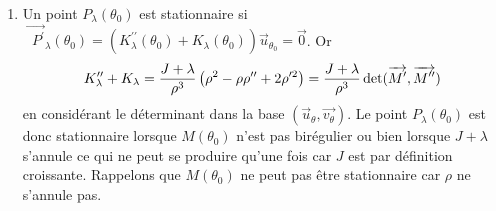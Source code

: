 \begin{enumerate}
\item  Un point $P_{\lambda }(\theta _{0})$ est stationnaire si$%
\overrightarrow{\text{ }P^{\prime }}_{\lambda }(\theta _{0})=(K_{\lambda
}^{\prime \prime }(\theta _{0})+K_{\lambda }(\theta _{0}))\overrightarrow{u}%
_{\theta _{0}}=\overrightarrow{0}$. Or 
\[
K_{\lambda }^{\prime \prime }+K_{\lambda }=\frac{J+\lambda }{\rho ^{3}}%
\left( \rho ^{2}-\rho \rho ^{\prime \prime }+2\rho ^{\prime 2}\right) =\frac{%
J+\lambda }{\rho ^{3}}\det (\overrightarrow{M^{\prime }},\overrightarrow{%
M^{\prime \prime }}) 
\]
en consid\'{e}rant le d\'{e}terminant dans la base $(\overrightarrow{u}%
_{\theta },\overrightarrow{v_{\theta }})$. Le point $P_{\lambda }(\theta
_{0})$ est donc stationnaire lorsque $M(\theta _{0})$ n'est pas
bir\'{e}gulier ou bien lorsque $J+\lambda $ s'annule ce qui ne peut se
produire qu'une fois car $J$ est par d\'{e}finition croissante. Rappelons
que $M(\theta _{0})$ ne peut pas \^{e}tre stationnaire car $\rho $ ne
s'annule pas.


\end{enumerate}
